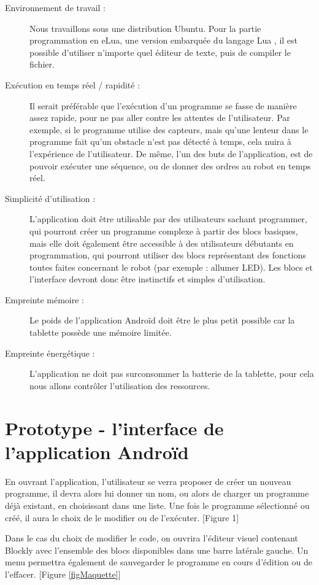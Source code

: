 \documentclass[12pt,francais]{report}
\begin{document}
\begin{description}
	\item [Environnement de travail :]Nous travaillons sous une distribution Ubuntu. Pour la partie programmation en eLua, une version embarquée du langage Lua \cite{refLua}, il est possible d'utiliser n'importe quel éditeur de texte, puis de compiler le fichier.
	\item [Exécution en temps réel / rapidité :] Il serait préférable que l'exécution d'un programme se fasse de manière assez rapide, pour ne pas aller contre les attentes de l'utilisateur. Par exemple, si le programme utilise des capteurs, mais qu'une lenteur dans le programme fait qu'un obstacle n'est pas détecté à temps, cela nuira à l'expérience de l'utilisateur. De même, l'un des buts de l'application, est de pouvoir exécuter une séquence, ou de donner des ordres au robot en temps réel. 
	\item [Simplicité d'utilisation : ]L'application doit être utilisable par des utilisateurs sachant programmer, qui pourront créer un programme complexe à partir des blocs basiques, mais elle doit également être accessible à des utilisateurs débutants en programmation, qui pourront utiliser des blocs représentant des fonctions toutes faites concernant le robot (par exemple : allumer LED). Les blocs et l'interface devront donc être instinctifs et simples d'utilisation.
	\item [Empreinte mémoire :] Le poids de l'application Androïd doit être le plus petit possible car la tablette possède une mémoire limitée.
	\item [Empreinte énergétique :] L'application ne doit pas surconsommer la batterie de la tablette, pour cela nous allons contrôler l'utilisation des ressources.
\end{description}

\section*{Prototype - l'interface de l'application Androïd }
En ouvrant l'application, l'utilisateur se verra proposer de créer un nouveau programme, il devra alors lui donner un nom, ou alors de charger un programme déjà existant, en choisissant dans une liste. Une fois le programme sélectionné ou créé, il aura le choix de le modifier ou de l'exécuter. [Figure 1]

Dans le cas du choix de modifier le code, on ouvrira l'éditeur visuel contenant Blockly avec l'ensemble des blocs disponibles dans une barre latérale gauche. Un menu permettra également de sauvegarder le programme en cours d'édition ou de l'effacer. [Figure \ref{figMaquette}]\\
\end{document}
